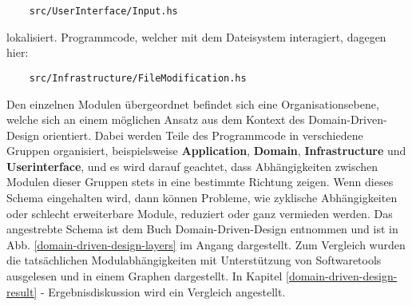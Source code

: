 \begin{verbatim}
    src/UserInterface/Input.hs
\end{verbatim}

lokalisiert. Programmcode, welcher mit dem Dateisystem interagiert, dagegen
hier:

\begin{verbatim}
    src/Infrastructure/FileModification.hs
\end{verbatim}

Den einzelnen Modulen übergeordnet befindet sich eine Organisationsebene, welche
sich an einem möglichen Ansatz aus dem Kontext des Domain-Driven-Design \cite{domain-driven-design}
orientiert. Dabei werden Teile des Programmcode in verschiedene Gruppen organisiert,
beispielsweise \textbf{Application}, \textbf{Domain}, \textbf{Infrastructure} und \textbf{Userinterface}, und es wird
darauf geachtet, dass Abhängigkeiten zwischen Modulen dieser Gruppen stets in
eine bestimmte Richtung zeigen. Wenn dieses Schema eingehalten wird, dann können
Probleme, wie zyklische Abhängigkeiten oder schlecht erweiterbare Module, reduziert
oder ganz vermieden werden. Das angestrebte Schema ist dem Buch Domain-Driven-Design \cite{domain-driven-design}
entnommen und ist in Abb. \ref{domain-driven-design-layers} im Angang dargestellt.
Zum Vergleich wurden die tatsächlichen Modulabhängigkeiten mit Unterstützung von
Softwaretools \cite{graphmod} \cite{xdot} ausgelesen und in einem Graphen dargestellt.
In Kapitel \ref{domain-driven-design-result} - Ergebnisdiskussion wird ein Vergleich
angestellt.